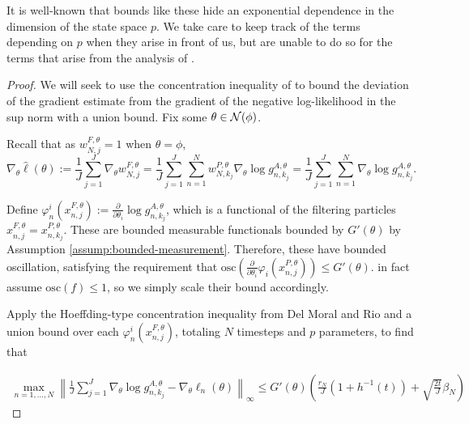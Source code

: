 \documentclass{article}
\begin{document}
It is well-known that bounds like these hide an exponential dependence in the dimension of the state space $p$. We take care to keep track of the terms depending on $p$ when they arise in front of us, but are unable to do so for the terms that arise from the analysis of \cite{delmoral2011ci}. 


\begin{proof}


We will seek to use the concentration inequality of \cite{delmoral2011ci} to bound the deviation of the gradient estimate from the gradient of the negative log-likelihood in the sup norm with a union bound. Fix some $\theta \in {\mathcal{N}}(\phi)$.


Recall that as $w_{N, j}^{F, \theta}=1$ when $\theta=\phi$,
$$
\nabla_\theta \hat{\ell}(\theta):=\frac{1}{J} \sum_{j=1}^J \nabla_\theta w_{N, j}^{F, \theta}=\frac{1}{J} \sum_{j=1}^J\sum_{n=1}^N  w_{N, k_j}^{P, \theta} \nabla_\theta \log g_{n,k_j}^{A,\theta} = \frac{1}{J} \sum_{j=1}^J\sum_{n=1}^N \nabla_\theta \log g_{n,k_j}^{A,\theta}.
$$

Define $\varphi_n^i(x_{n,j}^{F,\theta}) := \frac{\partial}{\partial\theta_i} \log g_{n,k_j}^{A,\theta}$, which is a functional of the filtering particles $x_{n,j}^{F,\theta} = x_{n,k_j}^{P,\theta}$. These are bounded measurable functionals bounded by $G'(\theta)$ by Assumption \ref{assump:bounded-measurement}. Therefore, these have bounded oscillation, satisfying the requirement that $\text{osc} \left(\frac{\partial}{\partial\theta_i} \varphi_i(x_{n,j}^{P,\theta}) \right) \leq G'(\theta)$. \cite{delmoral2011ci} in fact assume $\text{osc}(f) \leq 1$, so we simply scale their bound accordingly.


Apply the Hoeffding-type concentration inequality from Del Moral and Rio \cite{delmoral2011ci} and a union bound over each $\varphi_n^i(x_{n,j}^{F,\theta})$, totaling $N$ timesteps and $p$ parameters, to find that

\begin{align}
    \max_{n=1,...,N} \left\lVert\frac{1}{J}\sum_{j=1}^J\nabla_\theta \log g_{n,k_j}^{A,\theta} - \nabla_\theta \ell_n(\theta) \right\rVert_{\infty} \leq G'(\theta)\left(\frac{r_N}{J}(1+h^{-1}(t)) + \sqrt{\frac{2t}{J}}\beta_N \right)
\end{align}


\end{proof}
\end{document}
